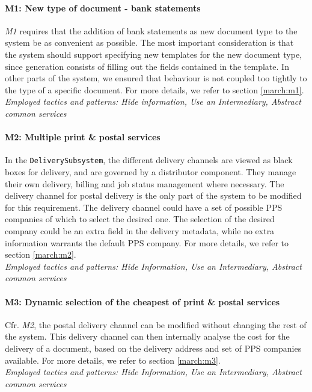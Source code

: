 \paragraph{M1: New type of document - bank statements} \emph{M1} requires that the addition of bank statements as new document type to the system be as convenient as possible. The most important consideration is that the system should support specifying new templates for the new document type, since generation consists of filling out the fields contained in the template. In other parts of the system, we ensured that behaviour is not coupled too tightly to the type of a specific document. For more details, we refer to section \ref{march:m1}.\\
\emph{Employed tactics and patterns: Hide information, Use an Intermediary, Abstract common services}
    
\paragraph{M2: Multiple print \& postal services} 
In the \texttt{DeliverySubsystem}, the different delivery channels are viewed as black boxes for delivery, and are governed by a distributor component. They manage their own delivery, billing and job status management where necessary. The delivery channel for postal delivery is the only part of the system to be modified for this requirement. The delivery channel could have a set of possible PPS companies of which to select the desired one. The selection of the desired company could be an extra field in the delivery metadata, while no extra information warrants the default PPS company. For more details, we refer to section \ref{march:m2}.\\
\emph{Employed tactics and patterns: Hide Information, Use an Intermediary, Abstract common services}
    
\paragraph{M3: Dynamic selection of the cheapest of print \& postal services}
Cfr. \emph{M2}, the postal delivery channel can be modified without changing the rest of the system. This delivery channel can then internally analyse the cost for the delivery of a document, based on the delivery address and set of PPS companies available. For more details, we refer to section \ref{march:m3}.\\
\emph{Employed tactics and patterns: Hide Information, Use an Intermediary, Abstract common services}

